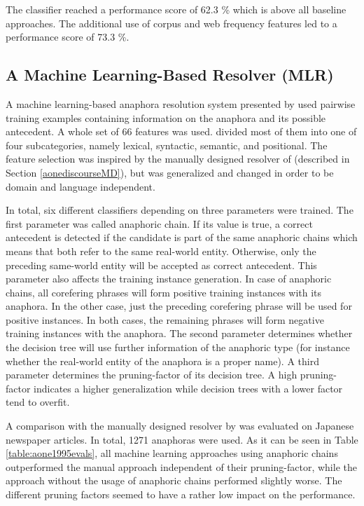 The classifier reached a performance score of 62.3 \% which is above all baseline approaches. The additional use of corpus and web frequency features led to a performance score of 73.3 \%. 

\subsection{A Machine Learning-Based Resolver (MLR)}
\label{MLRMDRComparison}
A machine learning-based anaphora resolution system presented by \cite{aone1995evaluating} used pairwise training examples containing information on the anaphora and its possible antecedent. A whole set of 66 features was used. \cite{aone1995evaluating} divided most of them into one of four subcategories, namely lexical, syntactic, semantic, and positional. The feature selection was inspired by the manually designed resolver of \cite{aone1993language} (described in Section \ref{aonediscourseMD}), but was generalized and changed in order to be domain and language independent.

In total, six different classifiers depending on three parameters were trained. The first parameter was called anaphoric chain. If its value is true, a correct antecedent is detected if the candidate is part of the same anaphoric chains which means that both refer to the same real-world entity. Otherwise, only the preceding same-world entity will be accepted as correct antecedent. This parameter also affects the training instance generation. In case of anaphoric chains, all corefering phrases will form positive training instances with its anaphora. In the other case, just the preceding corefering phrase will be used for positive instances. In both cases, the remaining phrases will form negative training instances with the anaphora. The second parameter determines whether the decision tree will use further information of the anaphoric type (for instance whether the real-world entity of the anaphora is a proper name). A third parameter determines the pruning-factor of its decision tree. A high pruning-factor indicates a higher generalization while decision trees with a lower factor tend to overfit. 

A comparison with the manually designed resolver by \cite{aone1993language} was evaluated on Japanese newspaper articles. In total, 1271 anaphoras were used. As it can be seen in Table \ref{table:aone1995evals}, all machine learning approaches using anaphoric chains outperformed the manual approach independent of their pruning-factor, while the approach without the usage of anaphoric chains performed slightly worse. The different pruning factors seemed to have a rather low impact on the performance.

